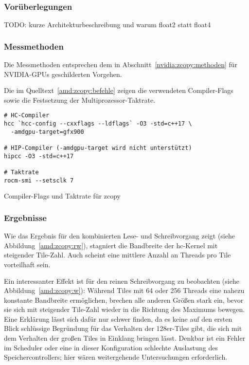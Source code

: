 \subsubsection{Vorüberlegungen}

TODO: kurze Architekturbeschreibung und warum float2 statt float4

\subsubsection{Messmethoden}

Die Messmethoden entsprechen dem in Abschnitt~\ref{nvidia:zcopy:methoden}
für NVIDIA-GPUs geschilderten Vorgehen.

Die im Quelltext~\ref{amd:zcopy:befehle} zeigen die verwendeten Compiler-Flags
sowie die Festsetzung der Multiprozessor-Taktrate.

\begin{code}
    \begin{verbatim}
# HC-Compiler
hcc `hcc-config --cxxflags --ldflags` -O3 -std=c++17 \
  -amdgpu-target=gfx900

# HIP-Compiler (-amdgpu-target wird nicht unterstützt)
hipcc -O3 -std=c++17

# Taktrate
rocm-smi --setsclk 7
    \end{verbatim}
    \caption{Compiler-Flags und Taktrate für zcopy}
    \label{amd:zcopy:befehle}
\end{code}

\subsubsection{Ergebnisse}

Wie das Ergebnis für den kombinierten Lese- und Schreibvorgang zeigt (siehe
Abbildung~\ref{amd:zcopy:rw}), stagniert die Bandbreite der \gls{hc}-Kernel mit
steigender Tile-Zahl. Auch scheint eine mittlere Anzahl an Threads pro Tile
vorteilhaft sein.

Ein interessanter Effekt ist für den reinen Schreibvorgang zu beobachten (siehe
Abbildung~\ref{amd:zcopy:w}): Während Tiles mit \num{64} oder \num{256} Threads
eine nahezu konstante Bandbreite ermöglichen, brechen alle anderen Größen stark
ein, bevor sie sich mit steigender Tile-Zahl wieder in die Richtung des Maximums
bewegen. Eine Erklärung lässt sich dafür nur schwer finden, da es keine auf den
ersten Blick schlüssige Begründung für das Verhalten der \num{128}er-Tiles gibt,
die sich mit dem Verhalten der großen Tiles in Einklang bringen lässt. Denkbar
ist ein Fehler im Scheduler oder eine in dieser Konfiguration schlechte
Auslastung des Speichercontrollers; hier wären weitergehende Untersuchungen
erforderlich.

